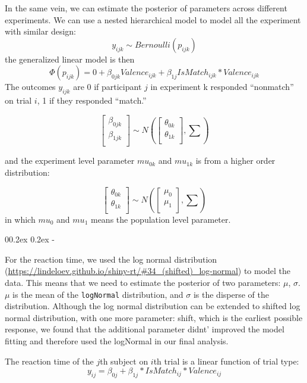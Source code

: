 \documentclass[
  english,
  man]{apa6}
\makeatletter
\let\oldsubparagraph\subparagraph
\renewcommand{\subparagraph}[1]{\oldsubparagraph{#1}\mbox{}}
\renewcommand{\subparagraph}[1]{\@startsection{subparagraph}{5}{1em}%
  {0\baselineskip \@plus 0.2ex \@minus 0.2ex}%
  {-\z@\relax}%
  {\normalfont\normalsize\itshape\hspace{\parindent}{#1}\textit{\addperi}}{\relax}}
\makeatother
\begin{document}
In the same vein, we can estimate the posterior of parameters across different experiments. We can use a nested hierarchical model to model all the experiment with similar design:
\[y_{ijk} \sim Bernoulli(p_{ijk})\]
the generalized linear model is then
\[ \Phi(p_{ijk}) =  0 + \beta_{0jk}Valence_{ijk} + \beta_{1j}IsMatch_{ijk} * Valence_{ijk}\]
The outcomes \(y_{ijk}\) are 0 if participant \(j\) in experiment k responded ``nonmatch'' on trial \(i\), 1 if they responded ``match.''

\[\begin{bmatrix}\beta_{0jk}\\
\beta_{1jk}\\
\end{bmatrix} \sim N(\begin{bmatrix}\theta_{0k}\\
\theta_{1k}\\
\end{bmatrix}, \sum)\]

and the experiment level parameter \(mu_{0k}\) and \(mu_{1k}\) is from a higher order distribution:

\[\begin{bmatrix}\theta_{0k}\\
\theta_{1k}\\
\end{bmatrix} \sim N(\begin{bmatrix}\mu_{0}\\
\mu_{1}\\
\end{bmatrix}, \sum)\]
in which \(mu_{0}\) and \(mu_{1}\) means the population level parameter.

\hypertarget{reaction-times}{%
\subparagraph{Reaction times}\label{reaction-times}}

For the reaction time, we used the log normal distribution (\url{https://lindeloev.github.io/shiny-rt/\#34_(shifted)_log-normal}) to model the data. This means that we need to estimate the posterior of two parameters: \(\mu\), \(\sigma\). \(\mu\) is the mean of the \texttt{logNormal} distribution, and \(\sigma\) is the disperse of the distribution. Although the log normal distribution can be extended to shifted log normal distribution, with one more parameter: shift, which is the earliest possible response, we found that the additional parameter didnt' improved the model fitting and therefore used the logNormal in our final analysis.

The reaction time of the \(j\)th subject on \(i\)th trial is a linear function of trial type: \[y_{ij} = \beta_{0j} + \beta_{1j}*IsMatch_{ij} * Valence_{ij}\]
\end{document}
